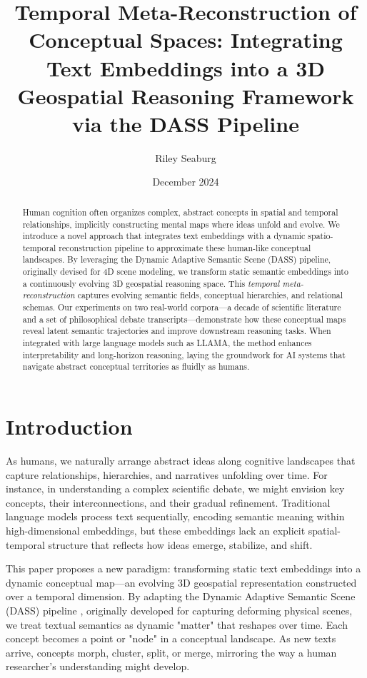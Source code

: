 \documentclass{article}
\title{Temporal Meta-Reconstruction of Conceptual Spaces: Integrating Text Embeddings into a 3D Geospatial Reasoning Framework via the DASS Pipeline}
\author{Riley Seaburg}
\date{December 2024}
\begin{document}
\maketitle

\begin{abstract}
Human cognition often organizes complex, abstract concepts in spatial and temporal relationships, implicitly constructing mental maps where ideas unfold and evolve. We introduce a novel approach that integrates text embeddings with a dynamic spatio-temporal reconstruction pipeline to approximate these human-like conceptual landscapes. By leveraging the Dynamic Adaptive Semantic Scene (DASS) pipeline, originally devised for 4D scene modeling, we transform static semantic embeddings into a continuously evolving 3D geospatial reasoning space. This \textit{temporal meta-reconstruction} captures evolving semantic fields, conceptual hierarchies, and relational schemas. Our experiments on two real-world corpora—a decade of scientific literature and a set of philosophical debate transcripts—demonstrate how these conceptual maps reveal latent semantic trajectories and improve downstream reasoning tasks. When integrated with large language models such as LLAMA, the method enhances interpretability and long-horizon reasoning, laying the groundwork for AI systems that navigate abstract conceptual territories as fluidly as humans.
\end{abstract}

\section{Introduction}
As humans, we naturally arrange abstract ideas along cognitive landscapes that capture relationships, hierarchies, and narratives unfolding over time. For instance, in understanding a complex scientific debate, we might envision key concepts, their interconnections, and their gradual refinement. Traditional language models process text sequentially, encoding semantic meaning within high-dimensional embeddings, but these embeddings lack an explicit spatial-temporal structure that reflects how ideas emerge, stabilize, and shift.

This paper proposes a new paradigm: transforming static text embeddings into a dynamic conceptual map—an evolving 3D geospatial representation constructed over a temporal dimension. By adapting the Dynamic Adaptive Semantic Scene (DASS) pipeline \cite{li2023dass}, originally developed for capturing deforming physical scenes, we treat textual semantics as dynamic "matter" that reshapes over time. Each concept becomes a point or "node" in a conceptual landscape. As new texts arrive, concepts morph, cluster, split, or merge, mirroring the way a human researcher's understanding might develop.
\end{document}
